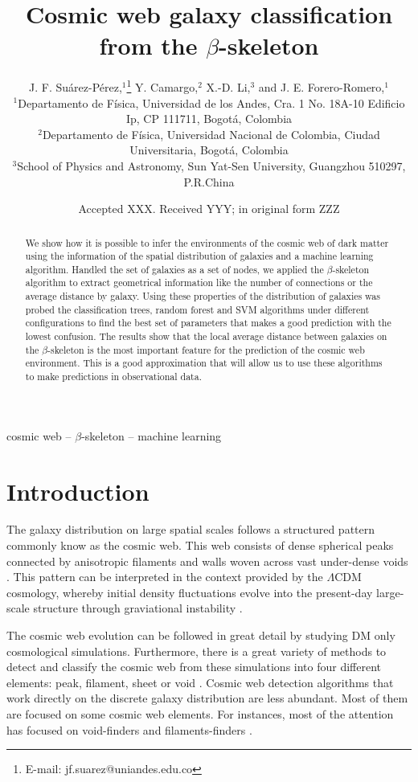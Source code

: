\documentclass[usenatbib]{mnras}
\title[The $\beta$-skeleton and the T-web]{Cosmic web galaxy classification from the $\beta$-skeleton}
\author[J. F. Su\'arez-P\'erez et al.]{
J. F. Su\'arez-P\'erez,$^{1}$\thanks{E-mail: jf.suarez@uniandes.edu.co}
Y. Camargo,$^{2}$ 
X.-D. Li,$^{3}$
and J. E. Forero-Romero,$^{1}$
\\
$^{1}$Departamento de F\'isica, Universidad de los Andes, Cra. 1 No. 18A-10 Edificio Ip, CP 111711, Bogot\'a, Colombia\\
$^{2}$Departamento de F\'isica, Universidad Nacional de Colombia, Ciudad Universitaria, Bogot\'a, Colombia\\
$^{3}$School of Physics and Astronomy, Sun Yat-Sen University, Guangzhou 510297, P.R.China\\
}
\date{Accepted XXX. Received YYY; in original form ZZZ}
\begin{document}
\label{firstpage}
\pagerange{\pageref{firstpage}--\pageref{lastpage}}
\maketitle

\begin{abstract}
We show how it is possible to infer the environments of the cosmic web
of dark matter using the information of the spatial distribution of
galaxies and a machine learning algorithm.
Handled the set of galaxies
as a set of nodes, we applied the $\beta$-skeleton algorithm to
extract geometrical information like the number of connections or the
average distance by galaxy.
Using these properties of the distribution
of galaxies was probed the classification trees, random forest and SVM algorithms under
different configurations to find the best set of parameters that makes
a good prediction with the lowest confusion. 
The results show that the
local average distance between galaxies on the $\beta$-skeleton is the
most important feature for the prediction of the cosmic web
environment. 
This is a good approximation that will allow us to use
these algorithms to make predictions in observational data. 
\end{abstract}

\begin{keywords}
cosmic web -- $\beta$-skeleton -- machine learning
\end{keywords}


\section{Introduction}
The galaxy distribution on large spatial scales follows a structured 
pattern commonly know as the cosmic web. 
This web consists of dense spherical peaks connected by
anisotropic filaments and walls woven across vast under-dense voids
\citep{Bond1996}. 
This pattern can be interpreted in the context provided
by the $\Lambda$CDM cosmology, whereby initial density fluctuations 
evolve into the present-day large-scale structure through graviational instability \citep{ZelDovich1970,White1987}. 

The cosmic web evolution can be followed in great detail by studying DM only cosmological simulations. Furthermore, there is a great variety of methods to detect and classify the cosmic web from these simulations into four different elements: peak, filament, sheet or void \citep{Libeskind2018}.
Cosmic web detection algorithms that work directly on the discrete galaxy distribution are less abundant.
Most of them are focused on some cosmic web elements.
For instances, most of the attention has focused on void-finders \citep{Platen2007,Neyrinck2008,Ravoux2020} and filaments-finders \citep{Novikov2003,Zhang2009,Sousbie2010,Chen2015,Luber2019,Malavasi2020}. 
\end{document}
